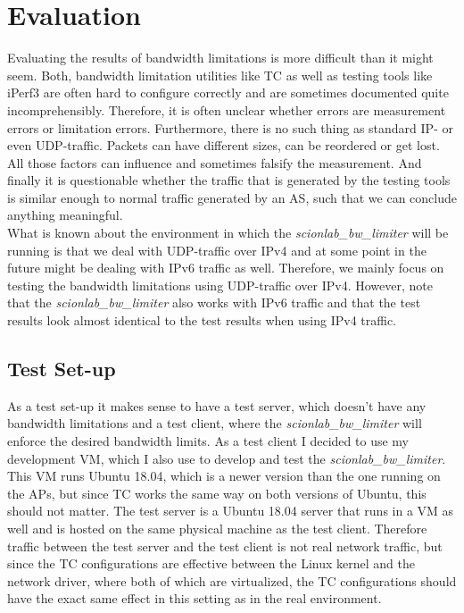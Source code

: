 \chapter{Evaluation}
Evaluating the results of bandwidth limitations is more difficult than it might seem. Both, bandwidth limitation utilities like \acs{TC} as well as testing tools like iPerf3 are often hard to configure correctly and are sometimes documented quite incomprehensibly. Therefore, it is often unclear whether errors are measurement errors or limitation errors. Furthermore, there is no such thing as standard \acs{IP}- or even \ac{UDP}-traffic. Packets can have different sizes, can be reordered or get lost. All those factors can influence and sometimes falsify the measurement. And finally it is questionable whether the traffic that is generated by the testing tools is similar enough to normal traffic generated by an \acs{AS}, such that we can conclude anything meaningful.
\\
What is known about the environment in which the \textit{scionlab\_bw\_limiter} will be running is that we deal with \acs{UDP}-traffic over \acs{IP}v4 and at some point in the future might be dealing with \acs{IP}v6 traffic as well. Therefore, we mainly focus on testing the bandwidth limitations using \acs{UDP}-traffic over \acs{IP}v4. However, note that the \textit{scionlab\_bw\_limiter} also works with \acs{IP}v6 traffic and that the test results look almost identical to the test results when using \acs{IP}v4 traffic.

\section{Test Set-up}

As a test set-up it makes sense to have a test server, which doesn't have any bandwidth limitations and a test client, where the \textit{scionlab\_bw\_limiter} will enforce the desired bandwidth limits. As a test client I decided to use my development \acs{VM}, which I also use to develop and test the \textit{scionlab\_bw\_limiter}. This \acs{VM} runs Ubuntu 18.04, which is a newer version than the one running on the \aclp{AP}, but since \acs{TC} works the same way on both versions of Ubuntu, this should not matter. The test server is a Ubuntu 18.04 server that runs in a \acs{VM} as well and is hosted on the same physical machine as the test client. Therefore traffic between the test server and the test client is not real network traffic, but since the \acs{TC} configurations are effective between the Linux kernel and the network driver, where both of which are virtualized, the \acs{TC} configurations should have the exact same effect in this setting as in the real environment.

